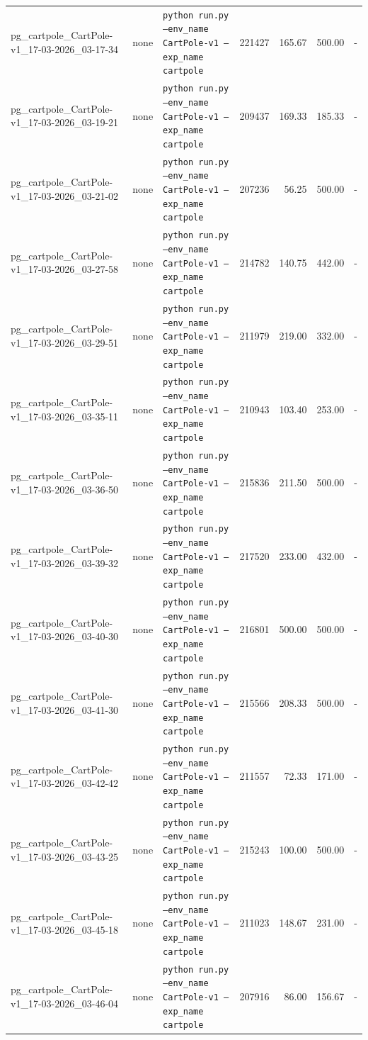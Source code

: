 \begin{table}[h]
\begin{tabular}{l l l r r r r}
pg\_cartpole\_CartPole-v1\_17-03-2026\_03-17-34 & none & \texttt{python run.py --env\_name CartPole-v1 --exp\_name cartpole} & 221427 & 165.67 & 500.00 & - \\
pg\_cartpole\_CartPole-v1\_17-03-2026\_03-19-21 & none & \texttt{python run.py --env\_name CartPole-v1 --exp\_name cartpole} & 209437 & 169.33 & 185.33 & - \\
pg\_cartpole\_CartPole-v1\_17-03-2026\_03-21-02 & none & \texttt{python run.py --env\_name CartPole-v1 --exp\_name cartpole} & 207236 & 56.25 & 500.00 & - \\
pg\_cartpole\_CartPole-v1\_17-03-2026\_03-27-58 & none & \texttt{python run.py --env\_name CartPole-v1 --exp\_name cartpole} & 214782 & 140.75 & 442.00 & - \\
pg\_cartpole\_CartPole-v1\_17-03-2026\_03-29-51 & none & \texttt{python run.py --env\_name CartPole-v1 --exp\_name cartpole} & 211979 & 219.00 & 332.00 & - \\
pg\_cartpole\_CartPole-v1\_17-03-2026\_03-35-11 & none & \texttt{python run.py --env\_name CartPole-v1 --exp\_name cartpole} & 210943 & 103.40 & 253.00 & - \\
pg\_cartpole\_CartPole-v1\_17-03-2026\_03-36-50 & none & \texttt{python run.py --env\_name CartPole-v1 --exp\_name cartpole} & 215836 & 211.50 & 500.00 & - \\
pg\_cartpole\_CartPole-v1\_17-03-2026\_03-39-32 & none & \texttt{python run.py --env\_name CartPole-v1 --exp\_name cartpole} & 217520 & 233.00 & 432.00 & - \\
pg\_cartpole\_CartPole-v1\_17-03-2026\_03-40-30 & none & \texttt{python run.py --env\_name CartPole-v1 --exp\_name cartpole} & 216801 & 500.00 & 500.00 & - \\
pg\_cartpole\_CartPole-v1\_17-03-2026\_03-41-30 & none & \texttt{python run.py --env\_name CartPole-v1 --exp\_name cartpole} & 215566 & 208.33 & 500.00 & - \\
pg\_cartpole\_CartPole-v1\_17-03-2026\_03-42-42 & none & \texttt{python run.py --env\_name CartPole-v1 --exp\_name cartpole} & 211557 & 72.33 & 171.00 & - \\
pg\_cartpole\_CartPole-v1\_17-03-2026\_03-43-25 & none & \texttt{python run.py --env\_name CartPole-v1 --exp\_name cartpole} & 215243 & 100.00 & 500.00 & - \\
pg\_cartpole\_CartPole-v1\_17-03-2026\_03-45-18 & none & \texttt{python run.py --env\_name CartPole-v1 --exp\_name cartpole} & 211023 & 148.67 & 231.00 & - \\
pg\_cartpole\_CartPole-v1\_17-03-2026\_03-46-04 & none & \texttt{python run.py --env\_name CartPole-v1 --exp\_name cartpole} & 207916 & 86.00 & 156.67 & - \\

\end{tabular}
\end{table}
